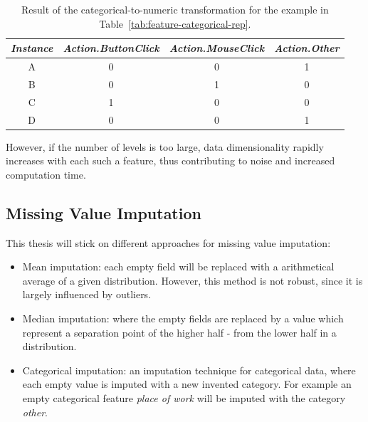 \begin{table}
  \begin{center}
    \caption{Result of the categorical-to-numeric transformation for the example in Table~\ref{tab:feature-categorical-rep}.}
    \label{tab:feature-binarization}
    \begin{tabular}{|c|c|c|c|}\hline
    \textit{Instance} & \textit{Action.ButtonClick} & \textit{Action.MouseClick} & \textit{Action.Other} \\
      \hline
     A & 0 & 0 & 1 \\ 
     \hline 
       B & 0 & 1 & 0 \\ 
     \hline
       C & 1 & 0 & 0 \\ 
     \hline
       D & 0 & 0 & 1 \\ 
     \hline
    \end{tabular}
  \end{center}
\end{table}

However, if the number of levels is too large, data dimensionality rapidly increases with each such a feature, thus contributing to noise and increased computation time.


\subsection{Missing Value Imputation}\label{Ch:2:MVI} 
This thesis will stick on different approaches for missing value imputation:

\begin{itemize}
    
        \item Mean imputation: each empty field will be replaced with a arithmetical average of a given distribution. However, this method is not robust, since it is largely influenced by outliers.
        
        \item Median imputation: where the empty fields are replaced by a value which represent a separation point of the higher half - from the lower half in a distribution. 
        
        \item Categorical imputation: an imputation technique for categorical data, where each empty value is imputed with a new invented category. For example an empty categorical feature \textit{place of work} will be imputed with the category \textit{other}. %
        
\end{itemize}



